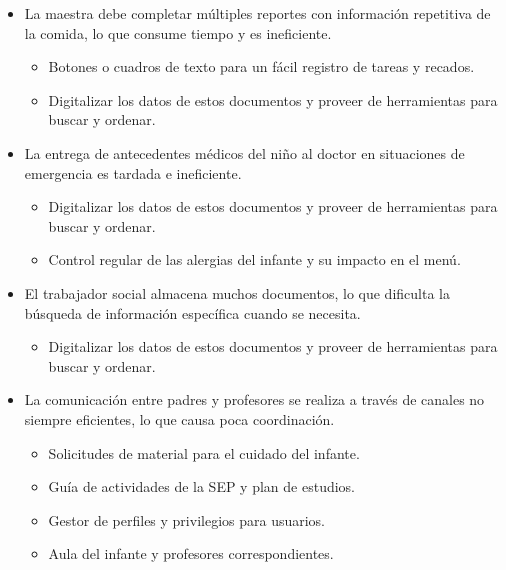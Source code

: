 \documentclass{article}
\begin{document}
\begin{itemize}
	\item   La maestra debe completar múltiples reportes con información repetitiva de la comida, lo que consume tiempo y es ineficiente.
	      \begin{itemize}
		      \item Botones o cuadros de texto para un fácil registro de tareas y recados.
		      \item Digitalizar los datos de estos documentos y proveer de herramientas para buscar y ordenar.
	      \end{itemize}

	\item  La entrega de antecedentes médicos del niño al doctor en situaciones de emergencia es tardada e ineficiente.
	      \begin{itemize}
		      \item Digitalizar los datos de estos documentos y proveer de herramientas para buscar y ordenar.
		      \item Control regular de las alergias del infante y su impacto en el menú.
	      \end{itemize}

	\item  El trabajador social almacena muchos documentos, lo que dificulta la búsqueda de información específica cuando se necesita.
	      \begin{itemize}
		      \item Digitalizar los datos de estos documentos y proveer de herramientas para buscar y ordenar.
	      \end{itemize}

	\item  La comunicación entre padres y profesores se realiza a través de canales no siempre eficientes, lo que causa poca coordinación.
	      \begin{itemize}
		      \item Solicitudes de material para el cuidado del infante.
		      \item Guía de actividades de la SEP y plan de estudios.
		      \item Gestor de perfiles y privilegios para usuarios.
		      \item Aula del infante y profesores correspondientes.
	      \end{itemize}


\end{itemize}
\end{document}
